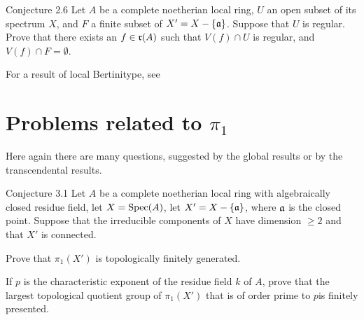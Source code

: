 \label{XIII.2.6}
\begin{enonce*}{Conjecture 2.6\ndemark}
Let $A$ be a complete noetherian local ring, $U$ an open subset of its spectrum $X$, and $F$ a finite subset of $X'=X-\{ \mathfrak{a}\}$. Suppose that $U$ is regular. Prove that there exists an $f \in\mathfrak{r}(A)$ such that $V(f)\cap U$ is regular, and $V(f)\cap F=\emptyset$.
\end{enonce*}

For a result of \og local Bertini\fg type, see ~\cite{XIII.2}

\section{Problems related to $\pi_1$} \label{XIII.3}
Here again there are many questions, suggested by the global results or by
the transcendental results.

\label{XIII.3.1}
\begin{enonce*}{Conjecture 3.1\ndemark}
Let $A$ be a complete noetherian local ring with algebraically closed
residue field, let $X=\operatorname{Spec}(A)$, let $X'=X-\{\mathfrak{a}\}$, where $\mathfrak{a}$ is the
closed point. Suppose that the irreducible components of $X$ have
dimension $\geq 2$ and that $X'$ is connected.
\begin{enumeratei}
\item
Prove that $\pi_1(X')$ is topologically finitely generated.
\item
If $p$ is the characteristic exponent of the residue field $k$ of $A$,
prove that the largest topological quotient group of $\pi_1(X')$ that is
\og of order prime to $p$\fg is finitely presented.
\end{enumeratei}
\end{enonce*}

